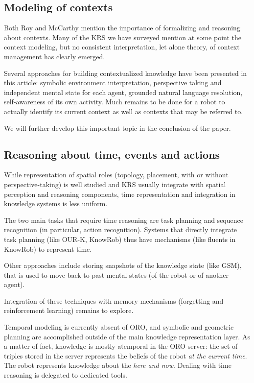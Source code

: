 \documentclass{IEEEtran}
\begin{document}
\subsection{Modeling of contexts}

Both Roy and McCarthy mention the importance of formalizing and reasoning about
contexts. Many of the KRS we have surveyed mention at some point the context
modeling, but no consistent interpretation, let alone theory, of context
management has clearly emerged.

Several approaches for building contextualized knowledge have been presented in
this article: symbolic environment interpretation, perspective taking and
independent mental state for each agent, grounded natural language resolution,
self-awareness of its own activity. Much remains to be done for a robot to
actually identify its current context as well as contexts that may be referred
to.

We will further develop this important topic in the conclusion of the paper.

\subsection{Reasoning about time, events and actions}

While representation of spatial roles (topology, placement, with or without
perspective-taking) is well studied and KRS usually integrate with spatial
perception and reasoning components, time representation and integration in
knowledge systems is less uniform.

The two main tasks that require time reasoning are task planning and sequence
recognition (in particular, action recognition). Systems that directly
integrate task planning (like OUR-K, {\sc KnowRob}) thus have mechanisms (like
fluents in {\sc KnowRob}) to represent time.

Other approaches include storing snapshots of the knowledge state (like GSM),
that is used to move back to past mental states (of the robot or of another
agent).

Integration of these techniques with memory mechanisms (forgetting and
reinforcement learning) remains to explore.

Temporal modeling is currently absent of ORO, and symbolic and geometric
planning are accomplished outside of the main knowledge representation
layer. As a matter of fact, knowledge is mostly atemporal in the ORO server: the
set of triples stored in the server represents the beliefs of the robot
\emph{at the current time}. The robot represents knowledge about the \emph{here
and now}. Dealing with time reasoning is delegated to dedicated tools.
\end{document}
